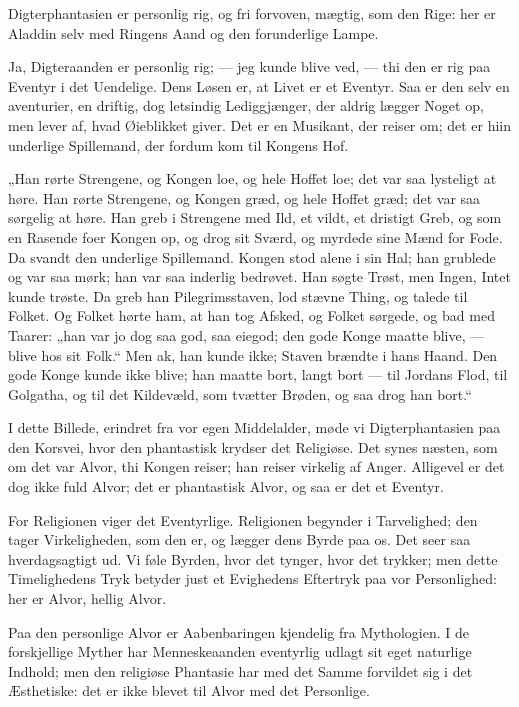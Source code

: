 \documentclass[12pt,a4paper]{book}
\newcommand{\apage}[1]{\marginnote{\footnotesize\textit{[#1]}}}
\begin{document}
Digterphantasien er personlig rig, og fri forvoven, mægtig, som den Rige: her
er Aladdin selv med Ringens Aand og den forunderlige Lampe.

Ja, Digteraanden er personlig rig; --- jeg kunde blive ved, --- thi den er rig
paa Eventyr i det Uendelige. Dens Løsen er, at Livet er et Eventyr. Saa er den
selv en aventurier, en driftig, dog letsindig Lediggjænger, der aldrig lægger
Noget op, men lever af, hvad Øieblikket giver. Det er en Musikant, der reiser
om; det er hiin underlige Spillemand, der fordum kom til Kongens Hof.

„Han rørte Strengene, og Kongen loe, og hele Hoffet loe; det var saa lysteligt
at høre. Han rørte Strengene, og Kongen græd, og hele Hoffet græd; det var saa
sørgelig at høre. Han greb i Strengene med Ild, et vildt, et dristigt Greb, og
som en Rasende foer Kongen op, og drog sit Sværd, og myrdede sine Mænd for
Fode. Da svandt den underlige Spillemand. Kongen stod alene i sin Hal; han
grublede og var saa mørk; han var saa inderlig bedrøvet. Han søgte Trøst, men
Ingen, Intet kunde trøste. Da greb han Pilegrimsstaven, lod stævne Thing, og
talede til Folket. Og Folket hørte ham, at han tog Afsked, og Folket sørgede,
og bad med Taarer: „han var jo dog saa god, saa eiegod; den gode Konge maatte
blive, --- blive hos sit Folk.“ Men \apage{15} ak,
han kunde ikke; Staven brændte i hans Haand. Den gode Konge kunde ikke blive;
han maatte bort, langt bort --- til Jordans Flod, til Golgatha, og til det
Kildevæld, som tvætter Brøden, og saa drog han bort.“

I dette Billede, erindret fra vor egen Middelalder, møde vi Digterphantasien
paa den Korsvei, hvor den phantastisk krydser det Religiøse. Det synes næsten,
som om det var Alvor, thi Kongen reiser; han reiser virkelig af Anger.
Alligevel er det dog ikke fuld Alvor; det er phantastisk Alvor, og saa er det
et Eventyr.

For Religionen viger det Eventyrlige. Religionen begynder i Tarvelighed; den
tager Virkeligheden, som den er, og lægger dens Byrde paa os. Det seer saa
hverdagsagtigt ud. Vi føle Byrden, hvor det tynger, hvor det trykker; men
dette Timelighedens Tryk betyder just et Evighedens Eftertryk paa vor
Personlighed: her er Alvor, hellig Alvor.

Paa den personlige Alvor er Aabenbaringen kjendelig fra Mythologien. I de
forskjellige Myther har Menneskeaanden eventyrlig udlagt sit eget naturlige
Indhold; men den religiøse Phantasie har med det Samme forvildet sig i det
Æsthetiske: det er ikke blevet til Alvor med det Personlige.
\end{document}
